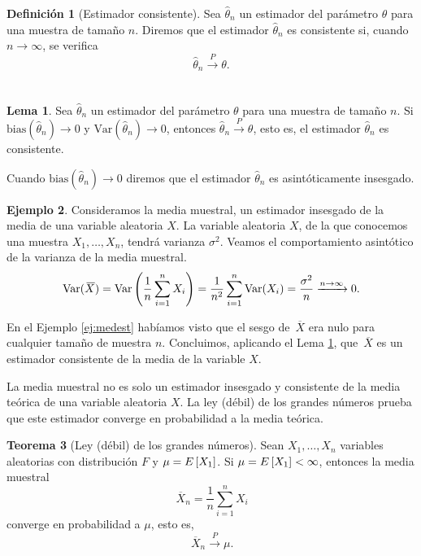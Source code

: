 \documentclass[12pt,a4paper]{report} %
\let\mathbb\relax
\newcommand{\bias}{\text{bias}}
\newcommand{\Var}{\text{Var}}
\newcommand{\olsi}[1]{\,\overline{\!{#1}}} %
\theoremstyle{definition}
\newtheorem{definition}{Definición}[section]
\newtheorem{theorem}{Teorema}[section]
\newtheorem{lemma}[theorem]{Lema}
\newtheorem{example}[theorem]{Ejemplo}
\begin{document}
\begin{definition}[Estimador consistente]
  Sea $\hat{\theta}_n$ un estimador del parámetro $\theta$ para una muestra de tamaño $n$. Diremos que el estimador $\hat{\theta}_n$ es consistente si, cuando $n\to\infty$, se verifica\[
\hat{\theta}_n\xrightarrow[]{P}\theta.
  \]\\[-10pt]
\end{definition}

\begin{lemma}\label{l:est_cons}
  Sea $\hat{\theta}_n$ un estimador del parámetro $\theta$ para una muestra de tamaño $n$. Si $\bias\left(\hat{\theta}_n\right)\to 0$ y $\Var\left(\hat{\theta}_n\right)\to0$, entonces $\hat{\theta}_n\xrightarrow[]{P}\theta$, esto es, el estimador $\hat{\theta}_n$ es consistente.\\
\end{lemma}

Cuando $\bias\left(\hat{\theta}_n\right)\to 0$ diremos que el estimador $\hat{\theta}_n$ es asintóticamente insesgado.\\

\begin{example}
  Consideramos la media muestral, un estimador insesgado de la media de una variable aleatoria $X$. La variable aleatoria $X$, de la que conocemos una muestra $X_1,\dots,X_n$, tendrá varianza $\sigma^2$. Veamos el comportamiento asintótico de la varianza de la media muestral.\[
\Var(\olsi{X}) = \Var\left(\frac{1}{n}\sum_{i=1}^nX_i\right) = \frac{1}{n^2}\sum_{i=1}^n\Var(X_i) = \frac{\sigma^2}{n}\xrightarrow[]{n\to\infty}0.\\
\]

En el Ejemplo \ref{ej:medest} habíamos visto que el sesgo de $\olsi{X}$ era nulo para cualquier tamaño de muestra $n$. Concluimos, aplicando el Lema \ref{l:est_cons}, que $\olsi{X}$ es un estimador consistente de la media de la variable $X$.\\
\end{example}

La media muestral no es solo un estimador insesgado y consistente de la media teórica de una variable aleatoria $X$. La ley (débil) de los grandes números prueba que este estimador converge en probabilidad a la media teórica.\\

\begin{theorem}[Ley (débil) de los grandes números]\label{t:lgn}
  Sean $X_1,\dots,X_n$ variables aleatorias con distribución $F$ y $\mu =\mathbb{E}\left [X_1 \right]$. Si $\mu =\mathbb{E}\left [X_1 \right] < \infty$, entonces la media muestral\[
\olsi{X}_n = \frac{1}{n}\sum_{i=1}^nX_i
\]converge en probabilidad a $\mu$, esto es,\[
\olsi{X}_n\xrightarrow[]{P} \mu.\]\\  [-10pt]
\end{theorem}
\end{document}
